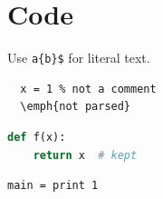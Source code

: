 
\section{Code}
Use \verb|a{b}$| for literal text.

\begin{verbatim}
  x = 1 % not a comment
  \emph{not parsed}
\end{verbatim}

\begin{lstlisting}[language=Python]
def f(x):
    return x  # kept
\end{lstlisting}

\begin{verbatim}
main = print 1
\end{verbatim}

